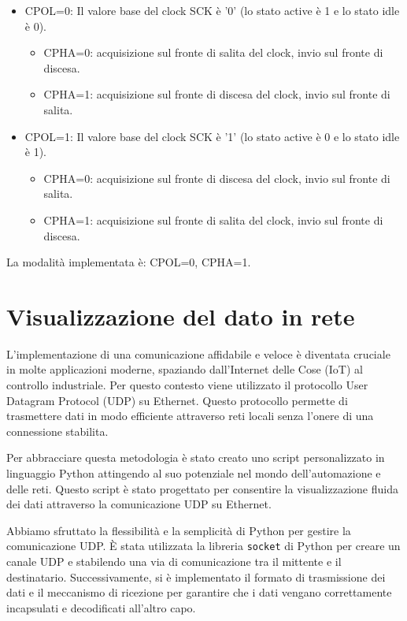 \documentclass[titlepage]{report}
\begin{document}
			\begin{itemize}
			  \item CPOL=0: Il valore base del clock SCK è '0' (lo stato active è 1 e lo stato idle è 0).
				\begin{itemize}
				  \item CPHA=0: acquisizione sul fronte di salita del clock, invio sul fronte di discesa.
				  \item CPHA=1: acquisizione sul fronte di discesa del clock, invio sul fronte di salita.
				\end{itemize}
			  \item CPOL=1: Il valore base del clock SCK è '1' (lo stato active è 0 e lo stato idle è 1).
				\begin{itemize}
				  \item CPHA=0: acquisizione sul fronte di discesa del clock, invio sul fronte di salita.
				  \item CPHA=1: acquisizione sul fronte di salita del clock, invio sul fronte di discesa.
				\end{itemize}
			\end{itemize}
			
			La modalità implementata è: CPOL=0, CPHA=1.

\chapter*{Visualizzazione del dato in rete}
\label{ch:visualizzazione_udp}
	L'implementazione di una comunicazione affidabile e veloce è diventata cruciale in molte applicazioni moderne, spaziando dall'Internet delle Cose (IoT) al controllo industriale. Per questo contesto viene utilizzato il protocollo User Datagram Protocol (UDP) su Ethernet. Questo protocollo permette di trasmettere dati in modo efficiente attraverso reti locali senza l'onere di una connessione stabilita.

	Per abbracciare questa metodologia è stato creato uno script personalizzato in linguaggio Python attingendo al suo potenziale nel mondo dell'automazione e delle reti. Questo script è stato progettato per consentire la visualizzazione fluida dei dati attraverso la comunicazione UDP su Ethernet.

	Abbiamo sfruttato la flessibilità e la semplicità di Python per gestire la comunicazione UDP. È stata utilizzata la libreria \texttt{socket} di Python per creare un canale UDP e stabilendo una via di comunicazione tra il mittente e il destinatario. Successivamente, si è implementato il formato di trasmissione dei dati e il meccanismo di ricezione per garantire che i dati vengano correttamente incapsulati e decodificati all'altro capo.
\end{document}

